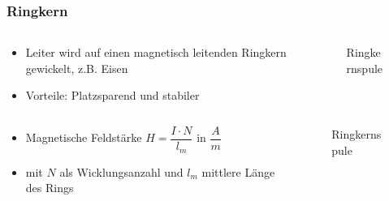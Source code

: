 \begin{frame}
\end{frame}

\begin{frame}
\frametitle{Ringkern}
\begin{columns}
    \begin{column}{0.48\textwidth}
    \begin{itemize}
  \item Leiter wird auf einen magnetisch leitenden Ringkern gewickelt, z.B. Eisen
  \item Vorteile: Platzsparend und stabiler
  \end{itemize}

    \end{column}
   \begin{column}{0.48\textwidth}
       
\begin{figure}
    \caption{\scriptsize Ringkernspule}
    \label{e_ringkern}
\end{figure}


   \end{column}
\end{columns}

\end{frame}

\begin{frame}
\begin{columns}
    \begin{column}{0.48\textwidth}
    \begin{itemize}
  \item Magnetische Feldstärke $H = \dfrac{I\cdot N}{l_m}$ in $\dfrac{A}{m}$
  \item mit $N$ als Wicklungsanzahl und $l_m$ mittlere Länge des Rings
  \end{itemize}

    \end{column}
   \begin{column}{0.48\textwidth}
       
\begin{figure}
    \caption{\scriptsize Ringkernspule}
    \label{e_ringkern}
\end{figure}


   \end{column}
\end{columns}

\end{frame}

